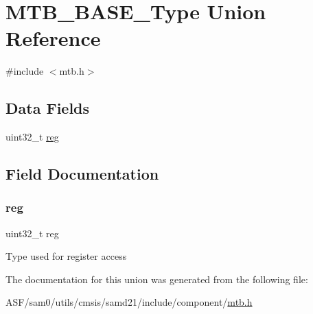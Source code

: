 \hypertarget{union_m_t_b___b_a_s_e___type}{}\section{M\+T\+B\+\_\+\+B\+A\+S\+E\+\_\+\+Type Union Reference}
\label{union_m_t_b___b_a_s_e___type}


{\ttfamily \#include $<$mtb.\+h$>$}

\subsection*{Data Fields}
\begin{DoxyCompactItemize}
\item 
uint32\+\_\+t \mbox{\hyperlink{union_m_t_b___b_a_s_e___type_a6b91636401516a477989a336376d7b40}{reg}}
\end{DoxyCompactItemize}


\subsection{Field Documentation}
\mbox{\label{union_m_t_b___b_a_s_e___type_a6b91636401516a477989a336376d7b40}} 
\subsubsection{\texorpdfstring{reg}{reg}}
{\footnotesize\ttfamily uint32\+\_\+t reg}

Type used for register access 

The documentation for this union was generated from the following file\+:\begin{DoxyCompactItemize}
\item 
A\+S\+F/sam0/utils/cmsis/samd21/include/component/\mbox{\hyperlink{component_2mtb_8h}{mtb.\+h}}\end{DoxyCompactItemize}
